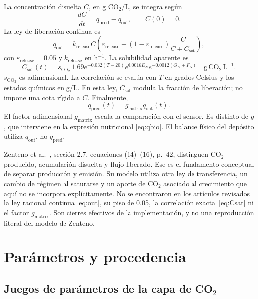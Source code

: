 \documentclass[11pt,a4paper]{article}
\newcommand{\qprod}{q_{\mathrm{prod}}}
\newcommand{\qout}{q_{\mathrm{out}}}
\newcommand{\qpred}{q_{\mathrm{pred}}}
\begin{document}
La concentración disuelta $C$, en g CO\(_2\)/L, se integra según
\begin{equation}
\frac{dC}{dt}=\qprod-\qout,\qquad C(0)=0.
\label{eq:pool}
\end{equation}
La ley de liberación continua es
\begin{equation}
\boxed{\qout=k_{\mathrm{release}}C
\left(\varepsilon_{\mathrm{release}}+
(1-\varepsilon_{\mathrm{release}})\frac{C}{C+C_{\mathrm{sat}}}\right),}
\label{eq:out}
\end{equation}
con $\varepsilon_{\mathrm{release}}=0.05$ y
$k_{\mathrm{release}}$ en h$^{-1}$. La solubilidad aparente es
\begin{equation}
C_{\mathrm{sat}}(t)=s_{\mathrm{CO_2}}\,
1.69e^{-0.032(T-20)}e^{0.0016E_N}e^{-0.0012(G_N+F_N)}
\quad\mathrm{g\,CO_2\,L^{-1}}.
\label{eq:Csat}
\end{equation}
$s_{\mathrm{CO_2}}$ es adimensional. La correlación se evalúa con $T$ en
grados Celsius y los estados químicos en g/L. En esta ley,
$C_{\mathrm{sat}}$ modula la fracción de liberación; no impone una cota rígida
a $C$. Finalmente,
\begin{equation}
\boxed{\qpred(t)=g_{\mathrm{matrix}}\qout(t).}
\label{eq:pred}
\end{equation}
El factor adimensional $g_{\mathrm{matrix}}$ escala la comparación con el
sensor. Es distinto de $g$, que interviene en la expresión nutricional
\eqref{eq:qbio}. El balance físico del depósito utiliza $\qout$, no
$\qpred$.

Zenteno et al.~\cite{zenteno2010}, sección 2.7, ecuaciones (14)--(16), p.~42,
distinguen CO\(_2\) producido, acumulación disuelta y flujo liberado. Ese es
el fundamento conceptual de separar producción y emisión. Su modelo utiliza
otra ley de transferencia, un cambio de régimen al saturarse y un aporte de
CO\(_2\) asociado al crecimiento que aquí no se incorpora explícitamente.
No se encontraron en los artículos revisados la ley racional continua
\eqref{eq:out}, su piso de 0.05, la correlación exacta~\eqref{eq:Csat}
ni el factor $g_{\mathrm{matrix}}$. Son cierres efectivos de la implementación,
y no una reproducción literal del modelo de Zenteno.

\section{Parámetros y procedencia}
\label{sec:params}

\subsection{Juegos de parámetros de la capa de \texorpdfstring{CO\(_2\)}{CO2}}
\end{document}
